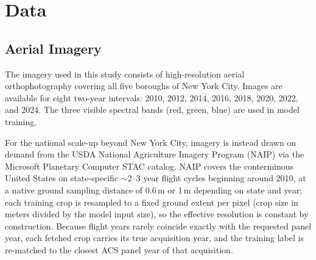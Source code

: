 \documentclass[conference]{IEEEtran}
\begin{document}
\section{Data}\label{sec:data}

\subsection{Aerial Imagery}
\label{sec:aerial}

The imagery used in this study consists of high-resolution aerial orthophotography covering all five boroughs of New York City. %
Images are available for eight two-year intervals: 2010, 2012, 2014, 2016, 2018, 2020, 2022, and 2024. The three visible spectral bands (red, green, blue) are used in model training.

For the national scale-up beyond New York City, imagery is instead drawn on demand from the USDA National Agriculture Imagery Program (NAIP) via the Microsoft Planetary Computer STAC catalog. NAIP covers the conterminous United States on state-specific $\sim$2--3 year flight cycles beginning around 2010, at a native ground sampling distance of 0.6\,m or 1\,m depending on state and year; each training crop is resampled to a fixed ground extent per pixel (crop size in meters divided by the model input size), so the effective resolution is constant by construction. Because flight years rarely coincide exactly with the requested panel year, each fetched crop carries its true acquisition year, and the training label is re-matched to the closest ACS panel year of that acquisition.

\end{document}
